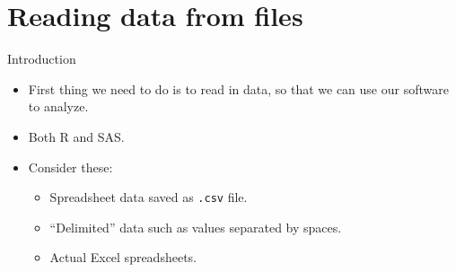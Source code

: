 \documentclass[unknownkeysallowed]{beamer}\usepackage[]{graphicx}\usepackage[]{color}
\begin{document}
%
%  
%
%  
%  
%
%  
%  
%  
%
%  
%
%      
%      
%  
%  






\section{Reading data from files}

\frame{\sectionpage}

\begin{frame}[fragile]{Introduction}
  
  \begin{itemize}
  \item First thing we need to do is to read in data, so that we can
    use our software to analyze.
  \item Both R and SAS.
  \item Consider these:
    \begin{itemize}
    \item Spreadsheet data saved as \texttt{.csv} file.
    \item ``Delimited'' data such as values separated by spaces.
    \item Actual Excel spreadsheets.
    \end{itemize}
  \end{itemize}
  
\end{frame}
\end{document}
